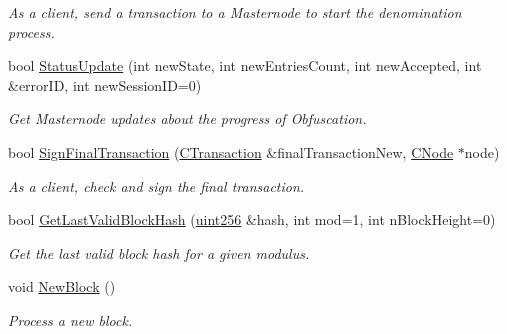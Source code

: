 \begin{DoxyCompactItemize}
\begin{DoxyCompactList}\small\item\em As a client, send a transaction to a Masternode to start the denomination process. \end{DoxyCompactList}\item 
\mbox{\label{class_c_obfuscation_pool_a4bd560d250f87f8d4b36e4d61688c296}} 
bool \mbox{\hyperlink{class_c_obfuscation_pool_a4bd560d250f87f8d4b36e4d61688c296}{Status\+Update}} (int new\+State, int new\+Entries\+Count, int new\+Accepted, int \&error\+ID, int new\+Session\+ID=0)
\begin{DoxyCompactList}\small\item\em Get Masternode updates about the progress of Obfuscation. \end{DoxyCompactList}\item 
\mbox{\label{class_c_obfuscation_pool_a0e8f20024a46f01a7e4ea1b22c7ed37e}} 
bool \mbox{\hyperlink{class_c_obfuscation_pool_a0e8f20024a46f01a7e4ea1b22c7ed37e}{Sign\+Final\+Transaction}} (\mbox{\hyperlink{class_c_transaction}{C\+Transaction}} \&final\+Transaction\+New, \mbox{\hyperlink{class_c_node}{C\+Node}} $\ast$node)
\begin{DoxyCompactList}\small\item\em As a client, check and sign the final transaction. \end{DoxyCompactList}\item 
\mbox{\label{class_c_obfuscation_pool_a88bd604c6770fed196317124579ebdc2}} 
bool \mbox{\hyperlink{class_c_obfuscation_pool_a88bd604c6770fed196317124579ebdc2}{Get\+Last\+Valid\+Block\+Hash}} (\mbox{\hyperlink{classuint256}{uint256}} \&hash, int mod=1, int n\+Block\+Height=0)
\begin{DoxyCompactList}\small\item\em Get the last valid block hash for a given modulus. \end{DoxyCompactList}\item 
\mbox{\label{class_c_obfuscation_pool_ac453b40e14687ea0608ad75a8fc7b747}} 
void \mbox{\hyperlink{class_c_obfuscation_pool_ac453b40e14687ea0608ad75a8fc7b747}{New\+Block}} ()
\begin{DoxyCompactList}\small\item\em Process a new block. \end{DoxyCompactList}\item 

\end{DoxyCompactItemize}
